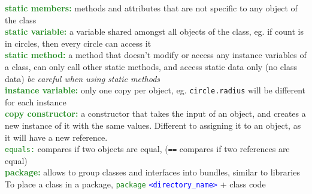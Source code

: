 \documentclass[a4paper,10pt]{article}
\begin{document}
\noindent \textcolor{ForestGreen}{\textbf{static members:}} methods and attributes that are not specific to any object of the class \\  
\textcolor{ForestGreen}{\textbf{static variable:}} a variable shared amongst all objects of the class, eg. if count is in circles, then every circle can access it \\
\textcolor{ForestGreen}{\textbf{static method:}} a method that doesn't modify or access any instance variables of a class, can only call other static methods, and access static data only (no class data) \emph{be careful when using static methods} \\
\textcolor{ForestGreen}{\textbf{instance variable:}} only one copy per object, eg. \texttt{circle.radius} will be different for each instance \\ 
\textcolor{ForestGreen}{\textbf{copy constructor:}} a constructor that takes the input of an object, and creates a new instance of it with the same values. Different to assigning it to an object, as it will have a new reference. \\
\textcolor{ForestGreen}{\texttt{equals:}} compares if two objects are equal, (\texttt{==} compares if two references are equal) \\
\textcolor{ForestGreen}{\textbf{package:}} allows to group classes and interfaces into bundles, similar to libraries \\
To place a class in a package, \textcolor{ForestGreen}{\texttt{package}} \textcolor{blue}{\texttt{<directory\_name>}} + class code \\
\end{document}
